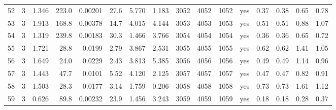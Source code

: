 \begin{table}[tb]
\begin{tabular}{lrrrrrrrrrrcrrrr}
52 & 3 & 1.346 & 223.0 & 0.00201 & 27.6 & 5.770 & 1.183 & 3052 & 4052 & 1052 & yes & 0.37 & 0.38 & 0.65 & 0.78 \\
53 & 3 & 1.913 & 168.8 & 0.00378 & 14.7 & 4.015 & 4.144 & 3053 & 4053 & 1053 & yes & 0.51 & 0.51 & 0.88 & 1.07 \\
54 & 3 & 1.319 & 239.8 & 0.00183 & 30.3 & 1.466 & 3.766 & 3054 & 4054 & 1054 & yes & 0.36 & 0.36 & 0.65 & 0.72 \\
55 & 3 & 1.721 & 28.8 & 0.0199 & 2.79 & 3.867 & 2.531 & 3055 & 4055 & 1055 & yes & 0.62 & 0.62 & 1.41 & 1.05 \\
56 & 3 & 1.649 & 24.0 & 0.0229 & 2.43 & 3.813 & 5.385 & 3056 & 4056 & 1056 & yes & 0.49 & 0.49 & 1.14 & 0.96 \\
57 & 3 & 1.443 & 47.7 & 0.0101 & 5.52 & 4.120 & 2.125 & 3057 & 4057 & 1057 & yes & 0.47 & 0.47 & 0.82 & 0.91 \\
58 & 3 & 1.503 & 28.3 & 0.0177 & 3.14 & 1.759 & 0.206 & 3058 & 4058 & 1058 & yes & 0.73 & 0.73 & 1.61 & 1.12 \\
59 & 3 & 0.626 & 89.8 & 0.00232 & 23.9 & 1.456 & 3.243 & 3059 & 4059 & 1059 & yes & 0.18 & 0.18 & 0.28 & 0.37 \\
\bottomrule
\end{tabular}
\end{table}
